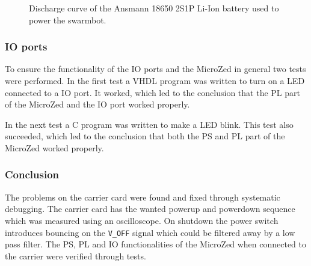 \begin{figure}[h]
  \centering
  
  \caption{Discharge curve of the Ansmann 18650 2S1P Li-Ion battery used to power the swarmbot.}
  \label{fig:discharge}
\end{figure}

\subsubsection*{IO ports}
To ensure the functionality of the IO ports and the MicroZed in general two tests were performed.
In the first test a VHDL program was written to turn on a LED connected to a IO port. 
It worked, which led to the conclusion that the PL part of the MicroZed and the IO port worked properly.

In the next test a C program was written to make a LED blink.
This test also succeeded, which led to the conclusion that both the PS and PL part of the MicroZed worked properly.

\subsubsection*{Conclusion}
The problems on the carrier card were found and fixed through systematic debugging.
The carrier card has the wanted powerup and powerdown sequence which was measured using an oscilloscope. 
On shutdown the power switch introduces bouncing on the \texttt{V\_OFF} signal which could be filtered away by a low pass filter.
The PS, PL and IO functionalities of the MicroZed when connected to the carrier were verified through tests.

